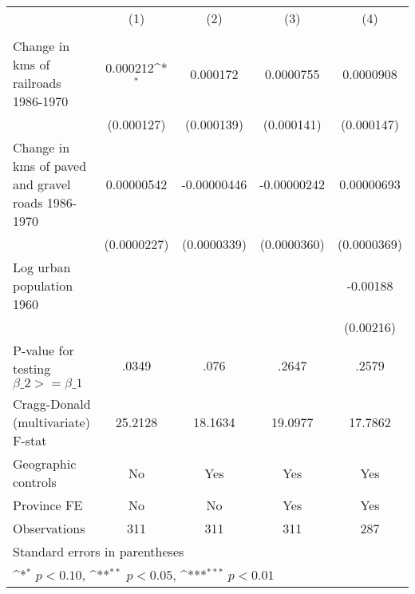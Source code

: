 {
\def\sym#1{\ifmmode^{#1}\else\(^{#1}\)\fi}
\begin{tabular}{l*{4}{c}}
\hline\hline
                &\multicolumn{1}{c}{(1)}&\multicolumn{1}{c}{(2)}&\multicolumn{1}{c}{(3)}&\multicolumn{1}{c}{(4)}\\
                &\multicolumn{1}{c}{}&\multicolumn{1}{c}{}&\multicolumn{1}{c}{}&\multicolumn{1}{c}{}\\
\hline
Change in kms of railroads 1986-1970& 0.000212\sym{*}  & 0.000172         &0.0000755         &0.0000908         \\
                &(0.000127)         &(0.000139)         &(0.000141)         &(0.000147)         \\
[1em]
Change in kms of paved and gravel roads 1986-1970&0.00000542         &-0.00000446         &-0.00000242         &0.00000693         \\
                &(0.0000227)         &(0.0000339)         &(0.0000360)         &(0.0000369)         \\
[1em]
Log urban population 1960&                  &                  &                  & -0.00188         \\
                &                  &                  &                  &(0.00216)         \\
\hline
P-value for testing $\beta\_{2} >= \beta\_{1}$&    .0349         &     .076         &    .2647         &    .2579         \\
Cragg-Donald (multivariate) F-stat&  25.2128         &  18.1634         &  19.0977         &  17.7862         \\
Geographic controls&       No         &      Yes         &      Yes         &      Yes         \\
Province FE     &       No         &       No         &      Yes         &      Yes         \\
Observations    &      311         &      311         &      311         &      287         \\
\hline\hline
\multicolumn{5}{l}{\footnotesize Standard errors in parentheses}\\
\multicolumn{5}{l}{\footnotesize \sym{*} \(p<0.10\), \sym{**} \(p<0.05\), \sym{***} \(p<0.01\)}\\
\end{tabular}
}

